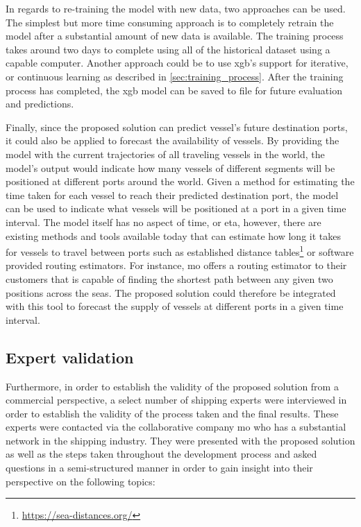 In regards to re-training the model with new data, two approaches can be used. The simplest but more time consuming approach is to completely retrain the model after a substantial amount of new data is available. The training process takes around two days to complete using all of the historical dataset using a capable computer. Another approach could be to use \acrfull{xgb}'s support for iterative, or continuous learning as described in \cref{sec:training_process}. After the training process has completed, the \acrshort{xgb} model can be saved to file for future evaluation and predictions.

Finally, since the proposed solution can predict vessel's future destination ports, it could also be applied to forecast the availability of vessels. By providing the model with the current trajectories of all traveling vessels in the world, the model's output would indicate how many vessels of different segments will be positioned at different ports around the world. Given a method for estimating the time taken for each vessel to reach their predicted destination port, the model can be used to indicate what vessels will be positioned at a port in a given time interval. The model itself has no aspect of time, or \acrshort{eta}, however, there are existing methods and tools available today that can estimate how long it takes for vessels to travel between ports such as established distance tables\footnote{\url{https://sea-distances.org/}} or software provided routing estimators. For instance, \acrfull{mo} offers a routing estimator to their customers that is capable of finding the shortest path between any given two positions across the seas. The proposed solution could therefore be integrated with this tool to forecast the supply of vessels at different ports in a given time interval.

\subsection{Expert validation}

Furthermore, in order to establish the validity of the proposed solution from a commercial perspective, a select number of shipping experts were interviewed in order to establish the validity of the process taken and the final results. These experts were contacted via the collaborative company \acrfull{mo} who has a substantial network in the shipping industry. They were presented with the proposed solution as well as the steps taken throughout the development process and asked questions in a semi-structured manner in order to gain insight into their perspective on the following topics:

